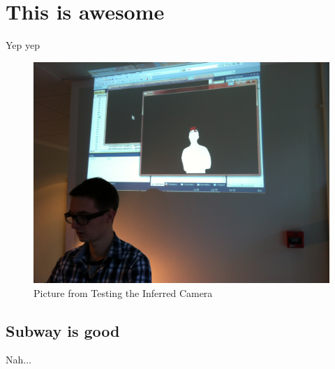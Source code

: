 \section{This is awesome}
Yep yep

\begin{figure}[htbp]
\centering
\includegraphics[width=1.00\textwidth]{Pictures/Test/IMG_1477.jpg}
\caption{Picture from Testing the Inferred Camera}
\label{fig:Picture from Testing the Inferred Camera}
\end{figure}

\subsection{Subway is good}
Nah...